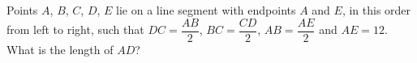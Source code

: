 Points $A$, $B$, $C$, $D$, $E$ lie on a line segment with endpoints $A$ and $E$, in this order from left to right, such that $DC=\dfrac{AB}{2}$, $BC=\dfrac{CD}{2}$, $AB=\dfrac{AE}{2}$ and $AE=12$. What is the length of $AD$?
